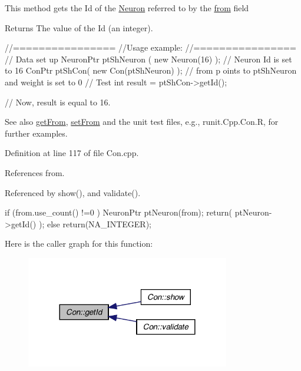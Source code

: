 This method gets the Id of the \hyperlink{class_neuron}{Neuron} referred to by the \hyperlink{class_con_a7c05f90dff56fd26c1fa0f042bba67a6}{from} field \begin{DoxyReturn}{Returns}
The value of the Id (an integer).
\end{DoxyReturn}

\begin{DoxyCode}
        //================
        //Usage example:
        //================
        // Data set up
                        NeuronPtr ptShNeuron ( new Neuron(16) );        // Neuron
       Id is set to 16
                        ConPtr ptShCon( new Con(ptShNeuron) );          // from p
      oints to ptShNeuron and weight is set to 0
        // Test
                        int result = ptShCon->getId();

        // Now, result is equal to 16.
\end{DoxyCode}


\begin{DoxySeeAlso}{See also}
\hyperlink{class_con_a0c126eb4479324b156768e0810723423}{getFrom}, \hyperlink{class_con_a40b0ebc859b40eb908ee937abf6886c5}{setFrom} and the unit test files, e.g., runit.Cpp.Con.R, for further examples. 
\end{DoxySeeAlso}


Definition at line 117 of file Con.cpp.



References from.



Referenced by show(), and validate().


\begin{DoxyCode}
                {
        if (from.use_count() !=0 ){
                NeuronPtr ptNeuron(from);
                return(  ptNeuron->getId() );
        } else {
                return(NA_INTEGER);
        }
}
\end{DoxyCode}


Here is the caller graph for this function:
\nopagebreak
\begin{figure}[H]
\begin{center}
\leavevmode
\includegraphics[width=252pt]{class_con_ad12ce81a557eadb2a00b10d5b5f4adb6_icgraph}
\end{center}
\end{figure}


